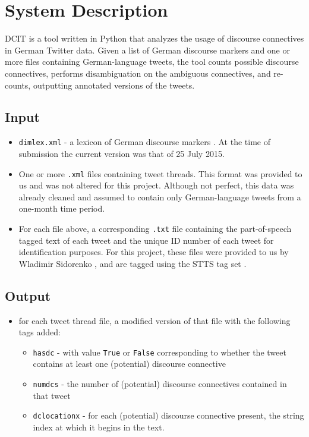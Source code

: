 \documentclass[11pt]{article}
\def\mono#1{\texttt{#1}}  %
\begin{document}
\section{System Description}
DCIT is a tool written in Python that analyzes the usage of discourse connectives in German Twitter data.  Given a list of German discourse markers and one or more files containing German-language tweets, the tool counts possible discourse connectives, performs disambiguation on the ambiguous connectives, and re-counts, outputting annotated versions of the tweets.

\subsection{Input}
\begin{itemize} 

\item \mono{dimlex.xml} - a lexicon of German discourse markers \cite{dimlex}.  At the time of submission the current version was that of 25 July 2015.

\item One or more \mono{.xml} files containing tweet threads.  This format was provided to us and was not altered for this project.  Although not perfect, this data was already cleaned and assumed to contain only German-language tweets from a one-month time period.

\item For each file above, a corresponding \mono{.txt} file containing the part-of-speech tagged text of each tweet and the unique ID number of each tweet for identification purposes.  For this project, these files were provided to us by Wladimir Sidorenko \cite{WladimirSidorenko}, and are tagged using the STTS tag set \cite{stts}.
\end{itemize}

\subsection{Output}
\begin{itemize} 

\item for each tweet thread file, a modified version of that file with the following tags added:
\begin{itemize} 

\item  \mono{has\textunderscore dc} - with value \mono{True} or \mono{False} corresponding to whether the tweet contains at least one (potential) discourse connective
\item  \mono{num\textunderscore dcs} - the number of (potential) discourse connectives contained in that tweet
\item  \mono{dc\textunderscore location\textunderscore x} - for each (potential) discourse connective present, the string index at which it begins in the text.

\end{itemize} %

\end{itemize} %
\end{document}
